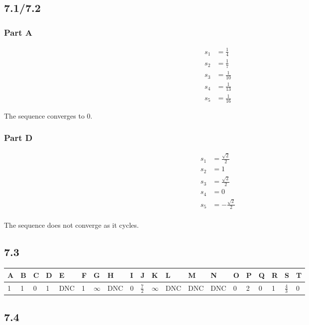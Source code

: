 \documentclass[12pt,titlepage]{extarticle}
\begin{document}
\subsection*{7.1/7.2}
\begin{multicols}{2}
\subsubsection*{Part A}
\begin{align*}
    s_1 &= \frac{1}{4} \\
    s_2 &= \frac{1}{7} \\
    s_3 &= \frac{1}{10} \\
    s_4 &= \frac{1}{13} \\
    s_5 &= \frac{1}{16}
\end{align*}

The sequence converges to $0$.

\subsubsection*{Part D}
\begin{align*}
    s_1 &= \frac{\sqrt{2}}{2} \\
    s_2 &= 1 \\
    s_3 &= \frac{\sqrt{2}}{2} \\
    s_4 &= 0 \\
    s_5 &= -\frac{\sqrt{2}}{2} \\
\end{align*}

The sequence does not converge as it cycles.
\end{multicols}

\subsection*{7.3}
\begin{table}[h!]
    \def\arraystretch{1.5}
\begin{tabular}{l|l|l|l|l|l|l|l|l|l|l|l|l|l|l|l|l|l|l|l}
A & B & C & D & E   & F & G        & H   & I & J             & K        & L   & M   & N   & O & P & Q & R & S             & T \\\hline
1 & 1 & 0 & 1 & DNC & 1 & $\infty$ & DNC & 0 & $\frac{7}{2}$ & $\infty$ & DNC & DNC & DNC & 0 & 2 & 0 & 1 & $\frac{4}{3}$ & 0
\end{tabular}
\end{table}

\subsection*{7.4}
\end{document}
